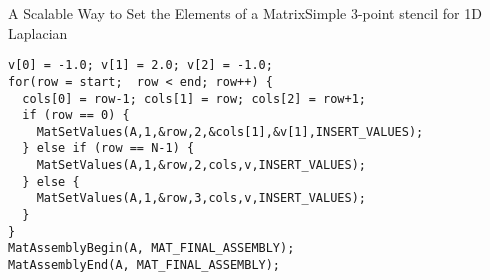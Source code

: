 \begin{frame}[fragile]{A Scalable Way to Set the Elements of a Matrix}{Simple 3-point stencil for 1D Laplacian}
\small
\begin{verbatim}
v[0] = -1.0; v[1] = 2.0; v[2] = -1.0;
for(row = start;  row < end; row++) {
  cols[0] = row-1; cols[1] = row; cols[2] = row+1;
  if (row == 0) {
    MatSetValues(A,1,&row,2,&cols[1],&v[1],INSERT_VALUES);
  } else if (row == N-1) {
    MatSetValues(A,1,&row,2,cols,v,INSERT_VALUES);
  } else {
    MatSetValues(A,1,&row,3,cols,v,INSERT_VALUES);
  }
}
MatAssemblyBegin(A, MAT_FINAL_ASSEMBLY);
MatAssemblyEnd(A, MAT_FINAL_ASSEMBLY);
\end{verbatim}
\end{frame}
